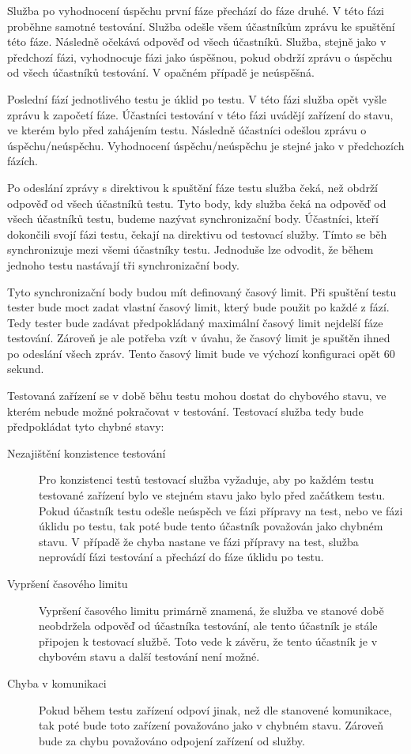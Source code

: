 Služba po vyhodnocení úspěchu první fáze přechází do fáze druhé. V této fázi proběhne samotné testování. Služba odešle všem účastníkům zprávu ke spuštění této fáze. Následně očekává odpověď od všech účastníků. Služba, stejně jako v předchozí fázi, vyhodnocuje fázi jako úspěšnou, pokud obdrží zprávu o úspěchu od všech účastníků testování. V opačném případě je neúspěšná.

Poslední fází jednotlivého testu je úklid po testu. V této fázi služba opět vyšle zprávu k započetí fáze. Účastníci testování v této fázi uvádějí zařízení do stavu, ve kterém bylo před zahájením testu. Následně účastníci odešlou zprávu o úspěchu/neúspěchu. Vyhodnocení úspěchu/neúspěchu je stejné jako v předchozích fázích.

Po odeslání zprávy s direktivou k spuštění fáze testu služba čeká, než obdrží odpověď od všech účastníků testu. Tyto body, kdy služba čeká na odpověď od všech účastníků testu, budeme nazývat synchronizační body. Účastníci, kteří dokončili svojí fázi testu, čekají na direktivu od testovací služby. Tímto se běh synchronizuje mezi všemi účastníky testu. Jednoduše lze odvodit, že během jednoho testu nastávají tři synchronizační body. 

Tyto synchronizační body budou mít definovaný časový limit. Při spuštění testu tester bude moct zadat vlastní časový limit, který bude použit po každé z fází. Tedy tester bude zadávat předpokládaný maximální časový limit nejdelší fáze testování. Zároveň je ale potřeba vzít v úvahu, že časový limit je spuštěn ihned po odeslání všech zpráv. Tento časový limit bude ve výchozí konfiguraci opět 60 sekund. 

Testovaná zařízení se v době běhu testu mohou dostat do chybového stavu, ve kterém nebude možné pokračovat v testování. Testovací služba tedy bude předpokládat tyto chybné stavy:


\begin{description}
    \item[Nezajištění konzistence testování] Pro konzistenci testů testovací služba vyžaduje, aby po každém testu testované zařízení bylo ve stejném stavu jako bylo před začátkem testu. Pokud účastník testu odešle neúspěch ve fázi přípravy na test, nebo ve fázi úklidu po testu, tak poté bude tento účastník považován jako chybném stavu. V případě že chyba nastane ve fázi přípravy na test, služba neprovádí fázi testování a přechází do fáze úklidu po testu. 
    \item[Vypršení časového limitu] Vypršení časového limitu primárně znamená, že služba ve stanové době neobdržela odpověď od účastníka testování, ale tento účastník je stále připojen k testovací službě. Toto vede k závěru, že tento účastník je v chybovém stavu a další testování není možné. 
    \item[Chyba v komunikaci] Pokud během testu zařízení odpoví jinak, než dle stanovené komunikace, tak poté bude toto zařízení považováno jako v chybném stavu. Zároveň bude za chybu považováno odpojení zařízení od služby.  
\end{description}

